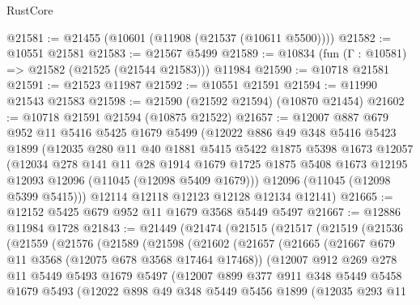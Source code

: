 \begin{lexlean}{RustCore}
\begin{coremodule}
@21581 := @21455 (@10601 (@11908 (@21537 (@10611 @5500))))
@21582 := @10551 @21581
@21583 := @21567 @5499
@21589 := @10834 (fun (Γ : @10581) => @21582 (@21525 (@21544 @21583))) @11984
@21590 := @10718 @21581
@21591 := @21523 @11987
@21592 := @10551 @21591
@21594 := @11990 @21543 @21583
@21598 := @21590 (@21592 @21594) (@10870 @21454)
@21602 := @10718 @21591 @21594 (@10875 @21522)
@21657 := @12007
    @887
    @679
    @952
    @11
    @5416
    @5425
    @1679
    @5499
    (@12022
      @886
      @49
      @348
      @5416
      @5423
      @1899
      (@12035
        @280
        @11
        @40
        @1881
        @5415
        @5422
        @1875
        @5398
        @1673
        @12057
        (@12034
          @278
          @141
          @11
          @28
          @1914
          @1679
          @1725
          @1875
          @5408
          @1673
          @12195
          @12093
          @12096
          (@11045 (@12098 @5409 @1679)))
        @12096
        (@11045 (@12098 @5399 @5415)))
      @12114
      @12118
      @12123
      @12128
      @12134
      @12141)
@21665 := @12152 @5425 @679 @952 @11 @1679 @3568 @5449 @5497
@21667 := @12886 @11984 @1728
@21843 := @21449
    (@21474
      (@21515
        (@21517
          (@21519
            (@21536
              (@21559
                (@21576
                  (@21589
                    (@21598
                      (@21602
                        (@21657
                          (@21665
                            (@21667 @679 @11 @3568 (@12075 @678 @3568 @17464 @17468))
                            (@12007
                              @912
                              @269
                              @278
                              @11
                              @5449
                              @5493
                              @1679
                              @5497
                              (@12007
                                @899
                                @377
                                @911
                                @348
                                @5449
                                @5458
                                @1679
                                @5493
                                (@12022
                                  @898
                                  @49
                                  @348
                                  @5449
                                  @5456
                                  @1899
                                  (@12035
                                    @293
                                    @11

\end{coremodule}
\end{lexlean}
